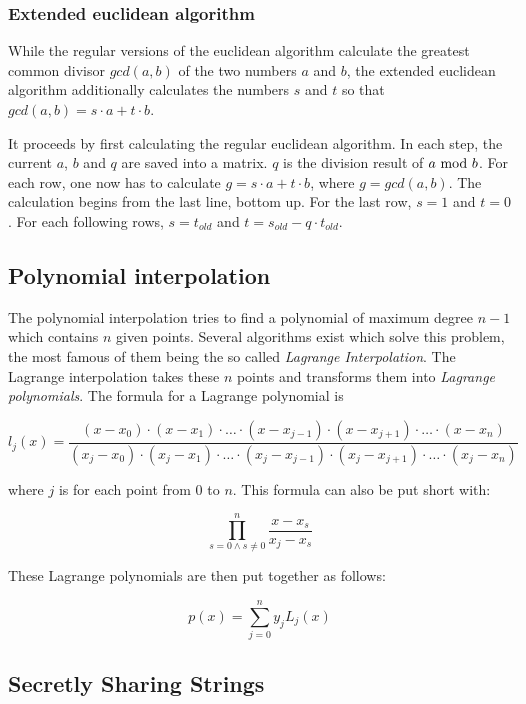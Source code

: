 \subsubsection{Extended euclidean algorithm}

While the regular versions of the euclidean algorithm calculate the greatest
common divisor $gcd(a, b)$ of the two numbers $a$ and $b$, the extended
euclidean algorithm additionally calculates the numbers $s$ and $t$ so
that $gcd(a, b) = s \cdot a + t \cdot b$.

It proceeds by first calculating the regular euclidean algorithm. In each
step, the current $a$, $b$ and $q$ are saved into a matrix. $q$ is the division
result of $a \ \text{mod}\ b$. For each row, one now has to calculate
$g = s \cdot a + t \cdot b$, where $g = gcd(a, b)$. The calculation begins from
the last line, bottom up. For the last row, $s = 1$ and $t = 0$. For each
following rows, $s = t_{old}$ and $t = s_{old} - q \cdot t_{old}$.

\subsection{Polynomial interpolation}

The polynomial interpolation tries to find a polynomial of maximum degree $n - 1$ which
contains $n$ given points. Several algorithms exist which solve this problem,
the most famous of them being the so called \textit{Lagrange Interpolation}. The
Lagrange interpolation takes these $n$ points and transforms them into \textit{Lagrange
polynomials}. The formula for a Lagrange polynomial is

$$l_j(x) = \frac{(x - x_0) \cdot (x - x_1) \cdot \ldots \cdot (x - x_{j - 1}) \cdot (x - x_{j + 1}) \cdot \ldots \cdot (x - x_n)}
{(x_j - x_0) \cdot (x_j - x_1) \cdot \ldots \cdot (x_j - x_{j - 1}) \cdot (x_j - x_{j + 1}) \cdot \ldots \cdot (x_j - x_n)}$$

where $j$ is for each point from $0$ to $n$. This formula can also be put short with:

$$\prod_{s = 0 \wedge s \neq 0}^{n} \frac{x - x_s}{x_j - x_s}$$

These Lagrange polynomials are then put together as follows:

$$p(x) = \sum_{j = 0}^{n} y_jL_j(x)$$

\subsection{Secretly Sharing Strings}

